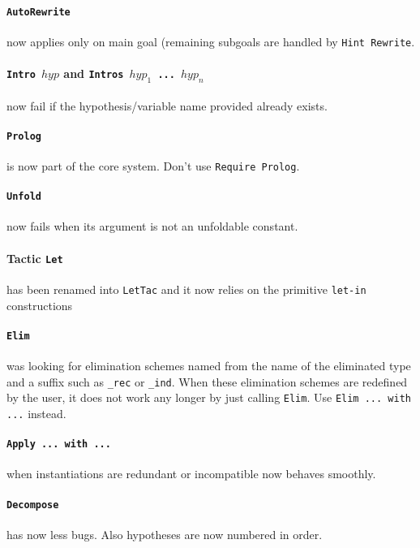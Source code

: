 \documentclass[11pt]{article}
\begin{document}
  \paragraph{{\tt AutoRewrite}} now applies only on main goal (remaining
  subgoals are handled by {\tt Hint Rewrite}.

  \paragraph{{\tt Intro $hyp$} and {\bf \tt Intros $hyp_1$ ... $hyp_n$}}
  now fail if the hypothesis/variable name provided already exists.

  \paragraph{{\tt Prolog}} is now part of the core
  system. Don't use {\tt Require Prolog}.

  \paragraph{{\tt Unfold}} now fails when its argument is not an
  unfoldable constant.

  \paragraph{Tactic {\tt Let}} has been renamed into {\tt LetTac}
  and it now relies on the primitive {\tt let-in} constructions

  \paragraph{{\tt Elim}} was looking for elimination schemes named
  from the name of the eliminated type and a suffix such as
  \verb:_rec: or \verb:_ind:. When these elimination schemes are
  redefined by the user, it does not work any longer by just calling
  {\tt Elim}. Use {\tt Elim ... with ...} instead.

  \paragraph{{\tt Apply ... with ...}} when instantiations are
  redundant or incompatible now behaves smoothly.

  \paragraph{{\tt Decompose}} has now less bugs. Also hypotheses
  are now numbered in order.
\end{document}
